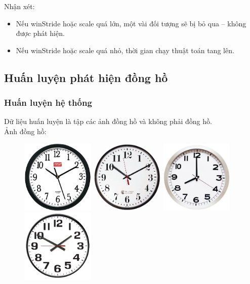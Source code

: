 \documentclass[../report.tex]{subfiles}
\begin{document}
\noindent Nhận xét:
\begin{itemize}
    \item Nếu winStride hoặc scale quá lớn, 
        một vài đối tượng sẽ bị bỏ qua – không được phát hiện.
    \item Nếu winStride hoặc scale quá nhỏ, 
        thời gian chạy thuật toán tang lên.
\end{itemize}

\subsection{Huấn luyện phát hiện đồng hồ}
\subsubsection{Huấn luyện hệ thống}
Dữ liệu huấn luyện là tập các ảnh 
đồng hồ và không phải đồng hồ. \\[3mm]
Ảnh đồng hồ:
\begin{figure}[H]
\centering
\includegraphics[width=3.5cm]{figures/clock-1.png}
\includegraphics[width=3.5cm]{figures/clock-2.png}
\includegraphics[width=3.5cm]{figures/clock-3.png}
\includegraphics[width=3.5cm]{figures/clock-4.png}
\end{figure}
\end{document}
